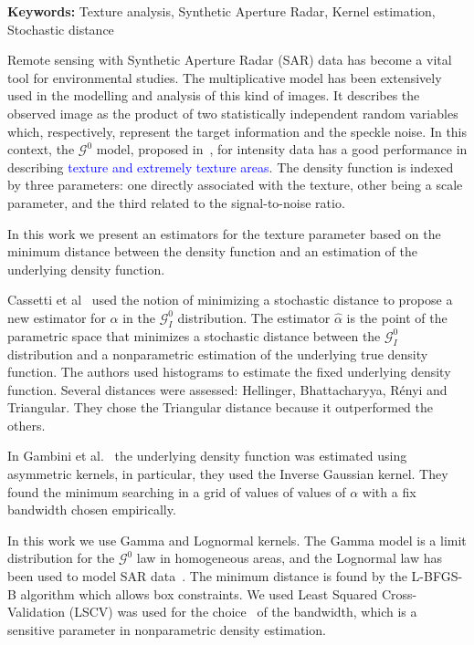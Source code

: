 \documentclass[a4paper]{article} %
\def\keywords#1{{\bf Keywords: }{#1}}
\begin{document}
\keywords{Texture analysis, Synthetic Aperture Radar, Kernel estimation, Stochastic distance}

\vspace{0.5cm}
Remote sensing with Synthetic Aperture Radar (SAR) data has become a vital tool for environmental studies. 
The multiplicative model has been extensively used in the modelling and analysis of this kind of images. 
It describes the observed image as the product of two statistically independent random variables which, respectively, represent the target information and the speckle noise. 
In this context, the $\mathcal{G}^{0}$ model, proposed in~\cite{Frery97}, for intensity data has a good performance in describing \textcolor{blue}{texture and extremely texture areas}. 
The density function is indexed by three parameters: one directly associated with the texture, other being a scale parameter, and the third related to the signal-to-noise ratio.

In this work we present an estimators for the texture parameter based on the minimum distance between the density function and an estimation of the underlying density function.

Cassetti et al~\cite{APSAR2013ParameterEstimationStochasticDistances} used the notion of minimizing a stochastic distance to propose a new estimator for $\alpha$ in the $\mathcal{G}_I^0$ distribution.
The estimator $\widehat{\alpha}$ is the point of the parametric space that minimizes a stochastic distance between the $\mathcal{G}_I^0$ distribution and a nonparametric estimation of the underlying true density function. 
The authors used histograms to estimate the fixed underlying density function. Several distances were assessed: Hellinger, Bhattacharyya, R\'enyi and Triangular. They chose the Triangular distance because it outperformed the others. 

In Gambini et al.~\cite{gambini2015} the underlying density function was estimated using asymmetric kernels, in particular, they used the Inverse Gaussian kernel. 
They found the minimum searching in a grid of values of values of $\alpha$ with a fix bandwidth chosen empirically.

In this work we use Gamma and Lognormal kernels.
The Gamma model is a limit distribution for the $\mathcal{G}^0$ law in homogeneous areas, and the Lognormal law has been used to model SAR data~\cite{Szajnowski1977}. 
The minimum distance is found by the L-BFGS-B algorithm which allows box constraints. 
We used Least Squared Cross-Validation (LSCV) was used for the choice~\cite{Rudemo1982} of the bandwidth, which is a sensitive parameter in nonparametric density estimation. 
\end{document}
